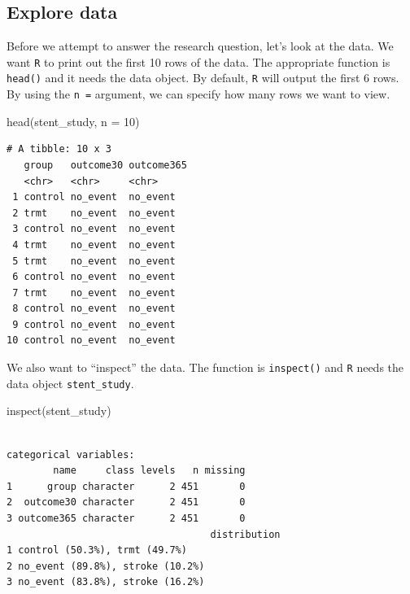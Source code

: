 \documentclass[
  letterpaper,
  DIV=11,
  numbers=noendperiod]{scrreprt}
\newenvironment{Shaded}{\begin{snugshade}}{\end{snugshade}}
\newcommand{\AttributeTok}[1]{\textcolor[rgb]{0.40,0.45,0.13}{#1}}
\newcommand{\DecValTok}[1]{\textcolor[rgb]{0.68,0.00,0.00}{#1}}
\newcommand{\FunctionTok}[1]{\textcolor[rgb]{0.28,0.35,0.67}{#1}}
\newcommand{\NormalTok}[1]{\textcolor[rgb]{0.00,0.23,0.31}{#1}}
\begin{document}
\subsection{Explore data}\label{explore-data}

Before we attempt to answer the research question, let's look at the
data. We want \texttt{R} to print out the first 10 rows of the data. The
appropriate function is \texttt{head()} and it needs the data object. By
default, \texttt{R} will output the first 6 rows. By using the
\texttt{n\ =} argument, we can specify how many rows we want to view.

\begin{Shaded}
\begin{Highlighting}[]
\FunctionTok{head}\NormalTok{(stent\_study, }\AttributeTok{n =} \DecValTok{10}\NormalTok{)}
\end{Highlighting}
\end{Shaded}

\begin{verbatim}
# A tibble: 10 x 3
   group   outcome30 outcome365
   <chr>   <chr>     <chr>     
 1 control no_event  no_event  
 2 trmt    no_event  no_event  
 3 control no_event  no_event  
 4 trmt    no_event  no_event  
 5 trmt    no_event  no_event  
 6 control no_event  no_event  
 7 trmt    no_event  no_event  
 8 control no_event  no_event  
 9 control no_event  no_event  
10 control no_event  no_event  
\end{verbatim}

We also want to ``inspect'' the data. The function is \texttt{inspect()}
and \texttt{R} needs the data object \texttt{stent\_study}.

\begin{Shaded}
\begin{Highlighting}[]
\FunctionTok{inspect}\NormalTok{(stent\_study)}
\end{Highlighting}
\end{Shaded}

\begin{verbatim}

categorical variables:  
        name     class levels   n missing
1      group character      2 451       0
2  outcome30 character      2 451       0
3 outcome365 character      2 451       0
                                   distribution
1 control (50.3%), trmt (49.7%)                
2 no_event (89.8%), stroke (10.2%)             
3 no_event (83.8%), stroke (16.2%)             
\end{verbatim}
\end{document}
